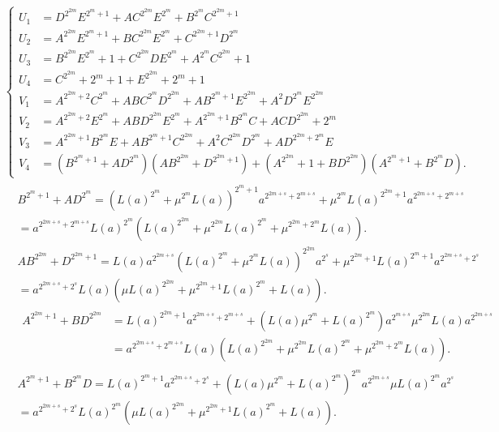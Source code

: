 \documentclass[10pt]{article}
\begin{document}
\begin{align*}
& \left\{\begin{aligned}
U_{1} & =D^{2^{2 m}} E^{2^{m}+1}+A C^{2^{2 m}} E^{2^{m}}+B^{2^{m}} C^{2^{2 m}+1} \\
U_{2} & =A^{2^{2 m}} E^{2^{m}+1}+B C^{2^{2 m}} E^{2^{m}}+C^{2^{2 m}+1} D^{2^{m}} \\
U_{3} & =B^{2^{2 m}} E^{2^{m}}+1+C^{2^{2 m}} D E^{2^{m}}+A^{2^{m}} C^{2^{2 m}}+1 \\
U_{4} & =C^{2^{2 m}}+2^{m}+1+E^{2^{2 m}}+2^{m}+1 \\
V_{1} & =A^{2^{2 m}+2} C^{2^{m}}+A B C^{2^{m}} D^{2^{2 m}}+A B^{2^{m}+1} E^{2^{2 m}}+A^{2} D^{2^{m}} E^{2^{2 m}} \\
V_{2} & =A^{2^{2 m}+2} E^{2^{m}}+A B D^{2^{2 m}} E^{2^{m}}+A^{2^{2 m}+1} B^{2^{m}} C+A C D^{2^{2 m}}+2^{m} \\
V_{3} & =A^{2^{2 m}+1} B^{2^{m}} E+A B^{2^{m}+1} C^{2^{2 m}}+A^{2} C^{2^{2 m}} D^{2^{m}}+A D^{2^{2 m}+2^{m}} E \\
V_{4} & =\left(B^{2^{m}+1}+A D^{2^{m}}\right)\left(A B^{2^{2 m}}+D^{2^{2 m}+1}\right)+\left(A^{2^{2 m}}+1+B D^{2^{2 m}}\right)\left(A^{2^{m}+1}+B^{2^{m}} D\right) .
\end{aligned}\right.  \tag{12}\\
& \begin{aligned}
& B^{2^{m}+1}+A D^{2^{m}}=\left(L(a)^{2^{m}}+\mu^{2^{m}} L(a)\right)^{2^{m}+1} a^{2^{2 m+s}+2^{m+s}}+\mu^{2^{m}} L(a)^{2^{2 m}+1} a^{2^{2 m+s}+2^{m+s}} \\
&=a^{2^{2 m+s}+2^{m+s}} L(a)^{2^{m}}\left(L(a)^{2^{2 m}}+\mu^{2^{2 m}} L(a)^{2^{m}}+\mu^{2^{2 m}+2^{m}} L(a)\right) . \\
& A B^{2^{2 m}}+D^{2^{2 m}+1}=L(a) a^{2^{2 m+s}}\left(L(a)^{2^{m}}+\mu^{2^{m}} L(a)\right)^{2^{2 m}} a^{2^{s}}+\mu^{2^{2 m}+1} L(a)^{2^{m}+1} a^{2^{2 m+s}+2^{s}} \\
&=a^{2^{2 m+s}+2^{s}} L(a)\left(\mu L(a)^{2^{2 m}}+\mu^{2^{2 m}+1} L(a)^{2^{m}}+L(a)\right) . \\
& \begin{aligned}
A^{2^{2 m}+1}+B D^{2^{2 m}} & =L(a)^{2^{2 m}+1} a^{2^{2 m+s}+2^{m+s}}+\left(L(a) \mu^{2^{m}}+L(a)^{2^{m}}\right) a^{2^{m+s}} \mu^{2^{2 m}} L(a) a^{2^{2 m+s}} \\
& =a^{2^{2 m+s}+2^{m+s}} L(a)\left(L(a)^{2^{2 m}}+\mu^{2^{2 m}} L(a)^{2^{m}}+\mu^{2^{2 m}+2^{m}} L(a)\right) .
\end{aligned} \\
& A^{2^{m}+1}+B^{2^{m}} D=L(a)^{2^{m}+1} a^{2^{2 m+s}+2^{s}}+\left(L(a) \mu^{2^{m}}+L(a)^{2^{m}}\right)^{2^{m}} a^{2^{2 m+s}} \mu L(a)^{2^{m}} a^{2^{s}} \\
&=a^{2^{2 m+s}+2^{s}} L(a)^{2^{m}}\left(\mu L(a)^{2^{2 m}}+\mu^{2^{2 m}+1} L(a)^{2^{m}}+L(a)\right) .
\end{aligned}
\end{align*}
\end{document}
